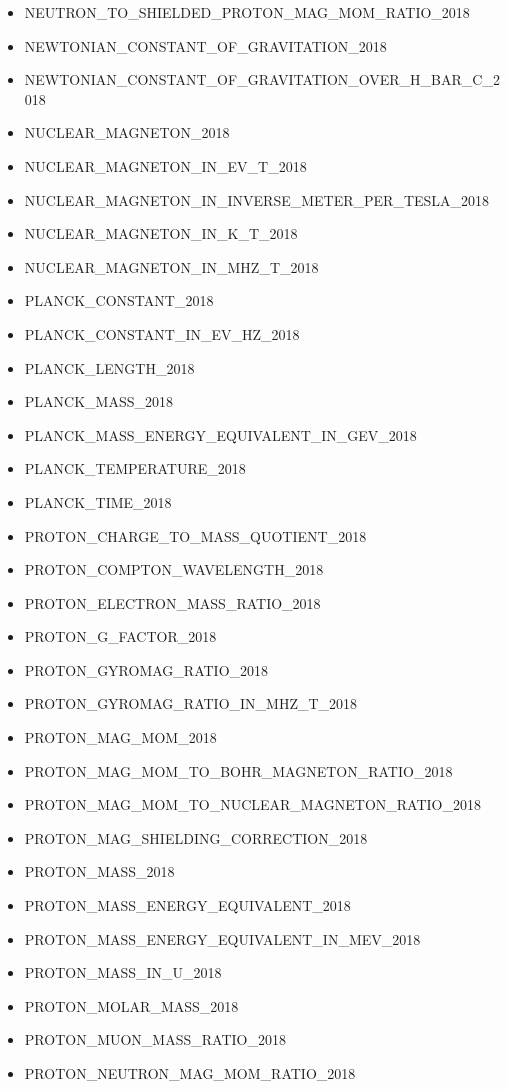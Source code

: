 \begin{itemize}
\item NEUTRON\_TO\_SHIELDED\_PROTON\_MAG\_MOM\_RATIO\_2018
\item NEWTONIAN\_CONSTANT\_OF\_GRAVITATION\_2018
\item NEWTONIAN\_CONSTANT\_OF\_GRAVITATION\_OVER\_H\_BAR\_C\_2018
\item NUCLEAR\_MAGNETON\_2018
\item NUCLEAR\_MAGNETON\_IN\_EV\_T\_2018
\item NUCLEAR\_MAGNETON\_IN\_INVERSE\_METER\_PER\_TESLA\_2018
\item NUCLEAR\_MAGNETON\_IN\_K\_T\_2018
\item NUCLEAR\_MAGNETON\_IN\_MHZ\_T\_2018
\item PLANCK\_CONSTANT\_2018
\item PLANCK\_CONSTANT\_IN\_EV\_HZ\_2018
\item PLANCK\_LENGTH\_2018
\item PLANCK\_MASS\_2018
\item PLANCK\_MASS\_ENERGY\_EQUIVALENT\_IN\_GEV\_2018
\item PLANCK\_TEMPERATURE\_2018
\item PLANCK\_TIME\_2018
\item PROTON\_CHARGE\_TO\_MASS\_QUOTIENT\_2018
\item PROTON\_COMPTON\_WAVELENGTH\_2018
\item PROTON\_ELECTRON\_MASS\_RATIO\_2018
\item PROTON\_G\_FACTOR\_2018
\item PROTON\_GYROMAG\_RATIO\_2018
\item PROTON\_GYROMAG\_RATIO\_IN\_MHZ\_T\_2018
\item PROTON\_MAG\_MOM\_2018
\item PROTON\_MAG\_MOM\_TO\_BOHR\_MAGNETON\_RATIO\_2018
\item PROTON\_MAG\_MOM\_TO\_NUCLEAR\_MAGNETON\_RATIO\_2018
\item PROTON\_MAG\_SHIELDING\_CORRECTION\_2018
\item PROTON\_MASS\_2018
\item PROTON\_MASS\_ENERGY\_EQUIVALENT\_2018
\item PROTON\_MASS\_ENERGY\_EQUIVALENT\_IN\_MEV\_2018
\item PROTON\_MASS\_IN\_U\_2018
\item PROTON\_MOLAR\_MASS\_2018
\item PROTON\_MUON\_MASS\_RATIO\_2018
\item PROTON\_NEUTRON\_MAG\_MOM\_RATIO\_2018

\end{itemize}
